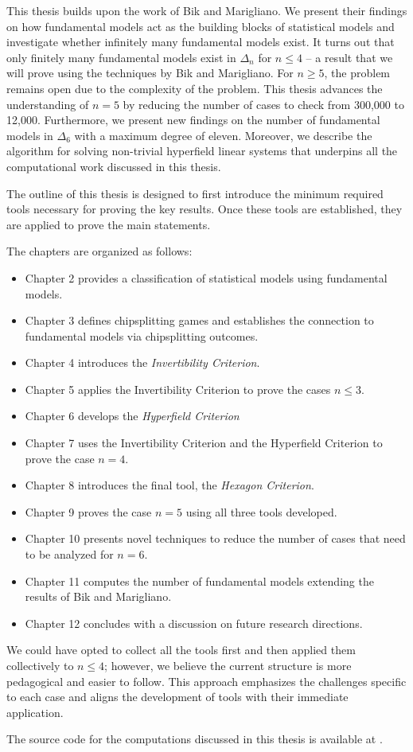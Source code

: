 This thesis builds upon the work of Bik and Marigliano. We present their findings on how fundamental models act as the building blocks of statistical models and investigate whether infinitely many fundamental models exist. It turns out that only finitely many fundamental models exist in \( \Delta_n \) for \( n \leq 4 \) -- a result that we will prove using the techniques by Bik and Marigliano. For \( n \geq 5 \), the problem remains open due to the complexity of the problem. This thesis advances the understanding of \( n = 5 \) by reducing the number of cases to check from 300,000 to 12,000. Furthermore, we present new findings on the number of fundamental models in \( \Delta_6 \) with a maximum degree of eleven. Moreover, we describe the algorithm for solving non-trivial hyperfield linear systems that underpins all the computational work discussed in this thesis. 

The outline of this thesis is designed to first introduce the minimum required tools necessary for proving the key results. Once these tools are established, they are applied to prove the main statements. 

The chapters are organized as follows:
\begin{itemize}
    \item Chapter 2 provides a classification of statistical models using fundamental models.
    \item Chapter 3 defines chipsplitting games and establishes the connection to fundamental models via chipsplitting outcomes.
    \item Chapter 4 introduces the \emph{Invertibility Criterion}.
    \item Chapter 5 applies the Invertibility Criterion to prove the cases \( n \leq 3 \).
    \item Chapter 6 develops the \emph{Hyperfield Criterion}
    \item Chapter 7 uses the Invertibility Criterion and the Hyperfield Criterion to prove the case \( n = 4 \).
    \item Chapter 8 introduces the final tool, the \emph{Hexagon Criterion}.
    \item Chapter 9 proves the case \( n = 5 \) using all three tools developed.
    \item Chapter 10 presents novel techniques to reduce the number of cases that need to be analyzed for \( n = 6 \).
    \item Chapter 11 computes the number of fundamental models extending the results of Bik and Marigliano.
    \item Chapter 12 concludes with a discussion on future research directions.
\end{itemize}


We could have opted to collect all the tools first and then applied them collectively to \( n \leq 4 \); however, we believe the current structure is more pedagogical and easier to follow. This approach emphasizes the challenges specific to each case and aligns the development of tools with their immediate application.

The source code for the computations discussed in this thesis is available at \cite{ducrepo}.
